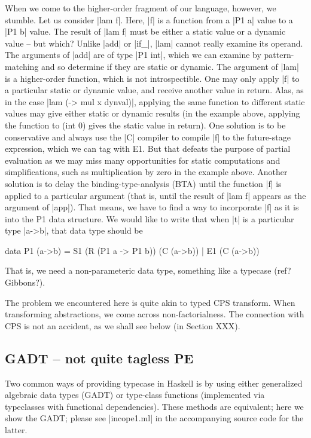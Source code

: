 \documentclass[preprint]{sigplanconf}
\begin{document}
When we come to the higher-order fragment of our language, however, we
stumble. Let us consider |lam f|. Here, |f| is a function from a
|P1 a| value to a |P1 b| value. The result of |lam f| must be either a
static value or a dynamic value -- but which? Unlike |add| or |if_|, 
|lam| cannot really examine its operand. The arguments of |add| are 
of type |P1 int|, which we can examine by pattern-matching and so 
determine if they are static or dynamic. The argument of |lam| is a 
higher-order function, which is not introspectible. One may only 
apply |f| to a particular static or dynamic value, and receive another 
value in return. Alas, as in the case |lam (\x -> mul x dynval)|, 
applying the same function to different static values may give 
either static or dynamic results (in the example above, applying 
the function to (int 0) gives the static value in return). One
solution is to be conservative and always use the |C| compiler to
compile |f| to the future-stage expression, which we can tag with
E1. But that defeats the purpose of partial evaluation as we may miss
many opportunities for static computations and simplifications, such
as multiplication by zero in the example above. Another solution is to
delay the binding-type-analysis (BTA) until the function |f| is
applied to a particular argument (that is, until the result of |lam f|
appears as the argument of |app|). That means, we have to find a way
to incorporate |f| as it is into the P1 data structure. We would like
to write that when |t| is a particular type |a->b|, that data type
should be 
\begin{code}
data P1 (a->b) = S1 (R (P1 a -> P1 b)) (C (a->b)) 
               | E1 (C (a->b))
\end{code}
That is, we need a non-parameteric data type, something like a
typecase (ref? Gibbons?).

The problem we encountered here is quite akin to typed CPS
transform. When transforming abstractions, we come across
non-factorialness. The connection with CPS is not an accident, as we
shall see below (in Section XXX).

\subsection{GADT -- not quite tagless PE}
\label{S:PE-GADT}

Two common ways of providing typecase in Haskell is by using either
generalized algebraic data types (GADT) or type-class functions
(implemented via typeclasses with functional dependencies). These
methods are equivalent; here we show the GADT; please see |incope1.ml|
in the accompanying source code for the latter.
\end{document}
